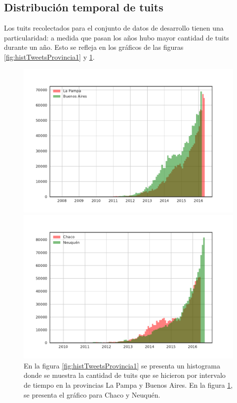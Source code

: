 \subsection{Distribución temporal de tuits}
Los tuits recolectados para el conjunto de datos de desarrollo tienen una particularidad: a medida que pasan los años 
hubo mayor cantidad de tuits durante un año. Esto se refleja en los gráficos de las figuras \ref{fig:histTweetsProvincia1} y \ref{fig:histTweetsProvincia2}.

\begin{figure}[!ht]\centering
   \begin{minipage}{0.49\textwidth}
     \includegraphics[width=\linewidth]{./images/train/sinFiltro/histTweetsProvincia1_sinFiltro.pdf}
     \caption{}
     \label{fig:histTweetsProvincia1}
   \end{minipage}
   \begin {minipage}{0.49\textwidth}
     \includegraphics[width=\linewidth]{./images/train/sinFiltro/histTweetsProvincia2_sinFiltro.pdf}
     \caption{}
     \label{fig:histTweetsProvincia2}
   \end{minipage}
   \caption { En la figura \ref{fig:histTweetsProvincia1} se presenta un histograma donde se muestra la cantidad de tuits que se hicieron por intervalo de tiempo en la provincias La Pampa y Buenos Aires. En la figura \ref{fig:histTweetsProvincia2}, se presenta el gráfico para Chaco y Neuquén.}
\end{figure}



